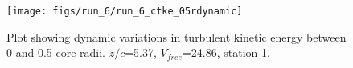 \begin{figure}[H]
\centering
\texttt{[image: figs/run\_6/run\_6\_ctke\_05rdynamic]}
\caption{Plot showing dynamic variations in turbulent kinetic energy between 0 and 0.5 core radii. $z/c$=5.37, $V_{free}$=24.86, station 1.}
\label{fig:run_6_ctke_05rdynamic}
\end{figure}


